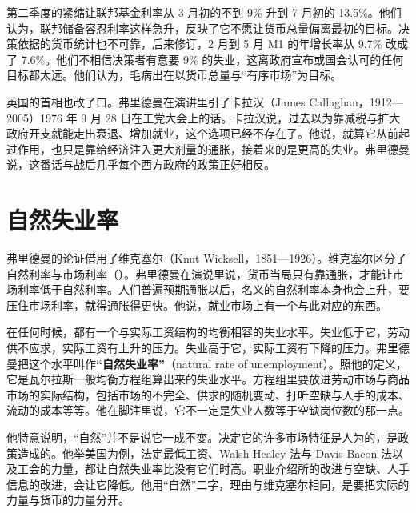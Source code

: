 第二季度的紧缩让联邦基金利率从 3 月初的不到 9\% 升到 7 月初的 13.5\%\cite{modigliani1975}。他们认为，联邦储备容忍利率这样急升，反映了它不愿让货币总量偏离最初的目标\cite{modigliani1975}。决策依据的货币统计也不可靠，后来修订，2 月到 5 月 M1 的年增长率从 9.7\% 改成了 7.6\%\cite{modigliani1975}。他们不相信决策者有意要 9\% 的失业，这离政府宣布或国会认可的任何目标都太远\cite{modigliani1975}。他们认为，毛病出在以货币总量与“有序市场”为目标\cite{modigliani1975}。

英国的首相也改了口。弗里德曼在演讲里引了卡拉汉（James Callaghan，1912—2005）1976 年 9 月 28 日在工党大会上的话\cite{friedman1976,loc44}。卡拉汉说，过去以为靠减税与扩大政府开支就能走出衰退、增加就业，这个选项已经不存在了\cite{friedman1976}。他说，就算它从前起过作用，也只是靠给经济注入更大剂量的通胀，接着来的是更高的失业\cite{friedman1976}。弗里德曼说，这番话与战后几乎每个西方政府的政策正好相反\cite{friedman1976}。

\section{自然失业率}\label{sec:naturalrate-friedman}

弗里德曼的论证借用了维克塞尔（Knut Wicksell，1851—1926）\cite{friedman1968,loc44}。维克塞尔区分了自然利率与市场利率（）。弗里德曼在演说里说，货币当局只有靠通胀，才能让市场利率低于自然利率\cite{friedman1968}。人们普遍预期通胀以后，名义的自然利率本身也会上升，要压住市场利率，就得通胀得更快\cite{friedman1968}。他说，就业市场上有一个与此对应的东西\cite{friedman1968}。

在任何时候，都有一个与实际工资结构的均衡相容的失业水平\cite{friedman1968}。失业低于它，劳动供不应求，实际工资有上升的压力。失业高于它，实际工资有下降的压力\cite{friedman1968}。弗里德曼把这个水平叫作\textbf{“自然失业率”}（natural rate of unemployment）。照他的定义，它是瓦尔拉斯一般均衡方程组算出来的失业水平\cite{friedman1968}。方程组里要放进劳动市场与商品市场的实际结构，包括市场的不完全、供求的随机变动、打听空缺与人手的成本、流动的成本等等\cite{friedman1968}。他在脚注里说，它不一定是失业人数等于空缺岗位数的那一点\cite{friedman1968}。

他特意说明，“自然”并不是说它一成不变\cite{friedman1968}。决定它的许多市场特征是人为的，是政策造成的\cite{friedman1968}。他举美国为例，法定最低工资、Walsh-Healey 法与 Davis-Bacon 法以及工会的力量，都让自然失业率比没有它们时高\cite{friedman1968}。职业介绍所的改进与空缺、人手信息的改进，会让它降低\cite{friedman1968}。他用“自然”二字，理由与维克塞尔相同，是要把实际的力量与货币的力量分开\cite{friedman1968}。

